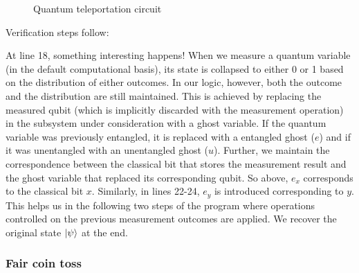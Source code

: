 \documentclass[adraft,creativecommons]{eptcs}
\begin{document}
\clearpage

\begin{figure}
    \centering
    \caption{Quantum teleportation circuit}
    \label{fig:teleport}
\end{figure}



\clearpage

Verification steps follow:



At line 18, something interesting happens! When we measure a quantum variable (in the default computational basis), its state is collapsed to either 0 or 1 based on the distribution of either outcomes. In our logic, however, both the outcome and the distribution are still maintained. This is achieved by replacing the measured qubit (which is implicitly discarded with the measurement operation) in the subsystem under consideration with a ghost variable. If the quantum variable was previously entangled, it is replaced with a entangled ghost ($e$) and if it was unentangled with an unentangled ghost ($u$). Further, we maintain the correspondence between the classical bit that stores the measurement result and the ghost variable that replaced its corresponding qubit. So above, $e_x$ corresponds to the classical bit $x$. Similarly, in lines 22-24, $e_y$ is introduced corresponding to $y$. This helps us in the following two steps of the program where operations controlled on the previous measurement outcomes are applied. We recover the original state $\ket{\psi}$ at the end.

\subsubsection{Fair coin toss}
\end{document}
